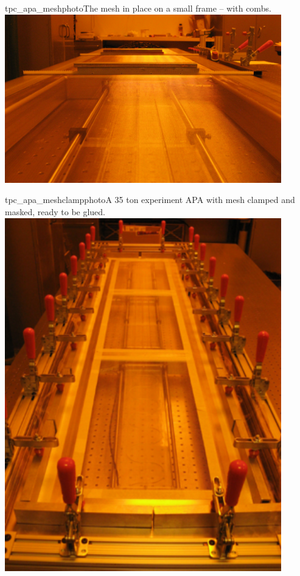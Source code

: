 \begin{cdrfigure}{tpc_apa_meshphoto}{The mesh in place on a small frame -- with combs.}
\includegraphics[width=0.9\textwidth]{figures/tpc_apa_meshphoto.png} 
\end{cdrfigure}

\begin{cdrfigure}{tpc_apa_meshclampphoto}{A 35 ton experiment APA with mesh clamped and masked, ready to be glued.}
\includegraphics[width=0.9\textwidth]{figures/tpc_apa_meshclampsphoto.png} 
\end{cdrfigure}

